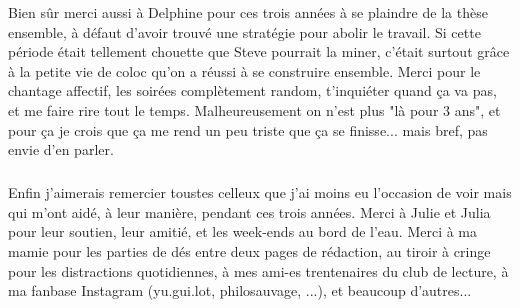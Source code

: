 Bien sûr merci aussi à Delphine pour ces trois années à se plaindre de la thèse ensemble, à défaut d'avoir trouvé une stratégie pour abolir le travail. Si cette période était tellement chouette que Steve pourrait la miner, c'était surtout grâce à la petite vie de coloc qu'on a réussi à se construire ensemble. Merci pour le chantage affectif, les soirées complètement random, t'inquiéter quand ça va pas, et me faire rire tout le temps. Malheureusement on n'est plus "là pour 3 ans", et pour ça je crois que ça me rend un peu triste que ça se finisse... mais bref, pas envie d'en parler.

\subparagraph{}Enfin j'aimerais remercier toustes celleux que j'ai moins eu l'occasion de voir mais qui m'ont aidé, à leur manière, pendant ces trois années. Merci à Julie et Julia pour leur soutien, leur amitié, et les week-ends au bord de l'eau. Merci à ma mamie pour les parties de dés entre deux pages de rédaction, au tiroir à cringe pour les distractions quotidiennes, à mes ami-es trentenaires du club de lecture, à ma fanbase Instagram (yu.gui.lot, philosauvage, ...), et beaucoup d'autres...

\thispagestyle{empty}